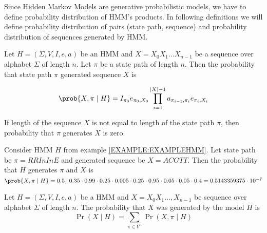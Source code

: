 
Since Hidden Markov Models are generative probabilistic models, we have to
define probability distribution of HMM's products. In following definitions we
will define probability distribution of pairs (state path, sequence) and
probability distribution of sequences generated by HMM.

\begin{definition}
Let $H=(\Sigma,V,I,e,a)$ be an HMM and $X=X_0X_1\dots X_{n-1}$ be a sequence over
alphabet $\Sigma$ of length $n$. Let $\pi$ be a state path of length $n$. Then the
probability that state path $\pi$ generated sequence $X$ is 

\[\prob{X,\pi\mid H}=
I_{\pi_0}e_{\pi_0,X_0}\prod_{i=1}^{|X|-1}a_{\pi_{i-1},\pi_i}e_{\pi_i,X_i}\]

If length of the sequence $X$ is not equal to length of the state path $\pi$,
then
probability that $\pi$ generates $X$ is zero.
\end{definition}



\begin{example}
Consider HMM $H$ from example \ref{EXAMPLE:EXAMPLEHMM}. Let state path be $\pi=RRInInE$ and
generated sequence be $X=ACGTT$. Then the probability that $H$ generates $\pi$
and $X$ is 
$\prob{ X,\pi\mid H } = 0.5 \cdot 0.35 \cdot 0.99 \cdot 0.25 \cdot 0.005 \cdot 0.25 \cdot 0.95 \cdot 0.05 \cdot 0.05 \cdot 0.4 =
0.5143359375  \cdot  10^{-7}$
\end{example}

\begin{definition}
Let $H=(\Sigma,V,I,e,a)$ be a HMM and $X=X_0X_1\dots,X_{n-1}$ be sequence over
alphabet $\Sigma$ of length $n$. The probability that $X$ was generated by the
model $H$ is 
\[\Pr\left(X\mid H\right)=\sum_{\pi\in V^n}\Pr\left(X,\pi\mid H\right)\]
\end{definition}



